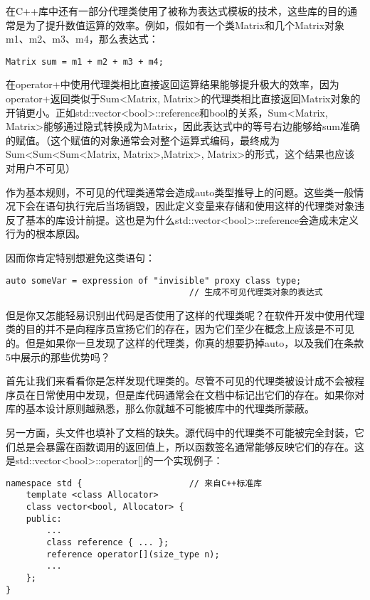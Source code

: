 在C++库中还有一部分代理类使用了被称为表达式模板的技术，这些库的目的通常是为了提升数值运算的效率。例如，假如有一个类Matrix和几个Matrix对象m1、m2、m3、m4，那么表达式：

\begin{lstlisting}
Matrix sum = m1 + m2 + m3 + m4;
\end{lstlisting}

在operator+中使用代理类相比直接返回运算结果能够提升极大的效率，因为operator+返回类似于Sum<Matrix, Matrix>的代理类相比直接返回Matrix对象的开销更小。正如std::vector<bool>::reference和bool的关系，Sum<Matrix, Matrix>能够通过隐式转换成为Matrix，因此表达式中的等号右边能够给sum准确的赋值。（这个赋值的对象通常会对整个运算式编码，最终成为Sum<Sum<Sum<Matrix, Matrix>,Matrix>, Matrix>的形式，这个结果也应该对用户不可见）

作为基本规则，不可见的代理类通常会造成auto类型推导上的问题。这些类一般情况下会在语句执行完后当场销毁，因此定义变量来存储和使用这样的代理类对象违反了基本的库设计前提。这也是为什么std::vector<bool>::reference会造成未定义行为的根本原因。

因而你肯定特别想避免这类语句：

\begin{lstlisting}
auto someVar = expression of "invisible" proxy class type;
                                    // 生成不可见代理类对象的表达式
\end{lstlisting}

但是你又怎能轻易识别出代码是否使用了这样的代理类呢？在软件开发中使用代理类的目的并不是向程序员宣扬它们的存在，因为它们至少在概念上应该是不可见的。但是如果你一旦发现了这样的代理类，你真的想要扔掉auto，以及我们在条款5中展示的那些优势吗？

首先让我们来看看你是怎样发现代理类的。尽管不可见的代理类被设计成不会被程序员在日常使用中发现，但是库代码通常会在文档中标记出它们的存在。如果你对库的基本设计原则越熟悉，那么你就越不可能被库中的代理类所蒙蔽。

另一方面，头文件也填补了文档的缺失。源代码中的代理类不可能被完全封装，它们总是会暴露在函数调用的返回值上，所以函数签名通常能够反映它们的存在。这是std::vector<bool>::operator[]的一个实现例子：

\begin{lstlisting}
namespace std {                     // 来自C++标准库
    template <class Allocator>
    class vector<bool, Allocator> {
    public:
        ...
        class reference { ... };
        reference operator[](size_type n);
        ...
    };
}
\end{lstlisting}

